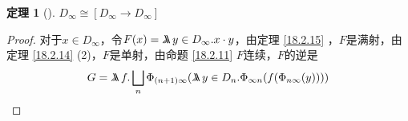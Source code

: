 \documentclass[11pt]{article}
\newtheorem{theorem}{定理}[section]
\begin{document}
\begin{theorem}[]
\(D_\infty\cong[D_\infty\to D_\infty]\)
\end{theorem}

\begin{proof}
对于\(x\in D_\infty\)，令\(F(x)=\metalambda y\in D_\infty.x\cdot y\)，由定理 \ref{18.2.15} ，\(F\)是满射，由定理
\ref{18.2.14} (2)，\(F\)是单射，由命题 \ref{18.2.11} \(F\)连续，\(F\)的逆是
\begin{equation*}
G=\metalambda f.\bigsqcup_n\Phi_{(n+1)\infty}(\metalambda y\in D_n.\Phi_{\infty n}(f(\Phi_{n\infty}(y))))
\end{equation*}
\end{proof}


\nocite{hindley2008lambda}
\nocite{zbMATH03877147}

\label{bibliographystyle link}


\label{bibliography link}

\end{document}
